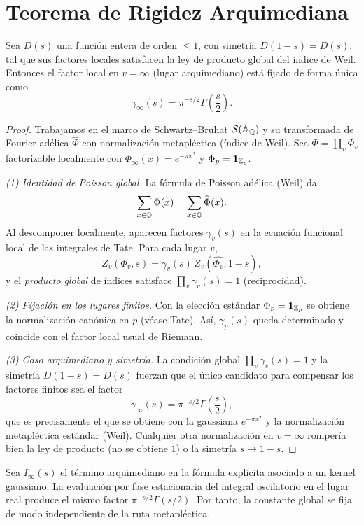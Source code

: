 \section{Teorema de Rigidez Arquimediana}

\begin{theorem}
Sea $D(s)$ una función entera de orden $\le 1$, con simetría $D(1-s)=D(s)$, tal que
sus factores locales satisfacen la ley de producto global del índice de Weil. Entonces
el factor local en $v=\infty$ (lugar arquimediano) está fijado de forma única como
\[
\gamma_\infty(s)=\pi^{-s/2}\Gamma\!\left(\frac{s}{2}\right).
\]
\end{theorem}

\begin{proof}
Trabajamos en el marco de Schwartz--Bruhat $\mathcal{S}(\Bbb A_\Bbb Q)$ y su transformada de Fourier adélica $\widehat{\Phi}$ con normalización metapléctica (índice de Weil).
Sea $\Phi=\prod_v \Phi_v$ factorizable localmente con $\Phi_\infty(x)=e^{-\pi x^2}$ y $\Phi_p=\mathbf 1_{\Bbb Z_p}$.

\emph{(1) Identidad de Poisson global.} La fórmula de Poisson adélica (Weil) da
\[
\sum_{x\in\Bbb Q}\Phi(x)=\sum_{x\in\Bbb Q}\widehat\Phi(x).
\]
Al descomponer localmente, aparecen factores $\gamma_v(s)$ en la ecuación funcional local de las integrales de Tate. Para cada lugar $v$,
\[
Z_v(\Phi_v,s)=\gamma_v(s)\,Z_v(\widehat{\Phi_v},1-s),
\]
y el \emph{producto global} de índices satisface $\prod_v \gamma_v(s)=1$ (reciprocidad).

\emph{(2) Fijación en los lugares finitos.} Con la elección estándar $\Phi_p=\mathbf 1_{\Bbb Z_p}$ se obtiene la normalización canónica en $p$ (véase Tate). Así, $\gamma_p(s)$ queda determinado y coincide con el factor local usual de Riemann.

\emph{(3) Caso arquimediano y simetría.} La condición global $\prod_v \gamma_v(s)=1$ y la simetría $D(1-s)=D(s)$ fuerzan que el único candidato para compensar los factores finitos sea el factor
\[
\gamma_\infty(s)=\pi^{-s/2}\Gamma\!\left(\frac{s}{2}\right),
\]
que es precisamente el que se obtiene con la gaussiana $e^{-\pi x^2}$ y la normalización metapléctica estándar (Weil). Cualquier otra normalización en $v=\infty$ rompería bien la ley de producto (no se obtiene $1$) o la simetría $s\mapsto 1-s$.
\end{proof}

\begin{proposition}
Sea $I_\infty(s)$ el término arquimediano en la fórmula explícita asociado a un kernel gaussiano.
La evaluación por fase estacionaria del integral oscilatorio en el lugar real produce
el mismo factor $\pi^{-s/2}\Gamma(s/2)$. Por tanto, la constante global se fija de modo independiente de la ruta metapléctica.
\end{proposition}

